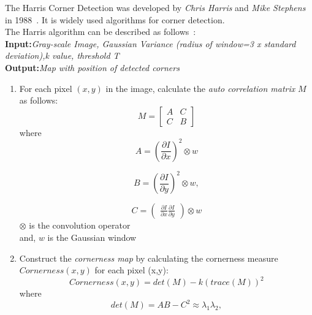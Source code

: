 The Harris Corner Detection was developed by \emph{Chris Harris} and \emph{Mike Stephens} in 1988~\cite{Parks:11}. It is widely used algorithms for corner detection.\\

\noindent The Harris algorithm can be described as follows~\cite{Parks:11}:\\

\noindent \textbf{Input:}\textit{Gray-scale Image, Gaussian Variance (radius of window=3 x standard deviation),k value, threshold T}\\
\textbf{Output:}\textit{Map with position of detected corners}\\
\begin{enumerate}
	\item For each pixel $(x,y)$ in the image, calculate the \emph{auto correlation matrix} $M$ as follows:\\ 
	\begin{equation}
		M=\left[ \begin{array}{cc}
			A & C\\
			C & B 
		\end{array}
		\right] 
	\label{eq:hessian-matrix}
	\end{equation}			
	where 
	\begin{equation}
					A=\left(\frac{\partial I}{\partial x}\right)^2 \otimes w 
	\label{eq:A}
	\end{equation}
	
	\begin{equation}
	        B=\left( \frac{\partial I}{\partial y} \right)^2 \otimes w, 
	\label{eq:B}
	\end{equation}
	
	\begin{equation}
				 C=\left( \begin{array}{c}\frac{\partial I}{\partial x} \frac{\partial I}{\partial y}\end{array}\right) \otimes w
	\label{eq:C}
	\end{equation} 
				$\otimes$ is the convolution operator\\
				and, $w$ is the Gaussian window	
						
\item Construct the \emph{cornerness map} by calculating the cornerness measure $Cornerness(x,y)$ for each pixel (x,y):\\
\begin{equation}
Cornerness(x,y)=det(M)-k(trace(M))^2
\label{eq:cornerness-map}
\end{equation} 
where 
\begin{equation}
det(M)=AB-C^2 \approx \lambda_1 \lambda_2,
\label{eq:deter-M}
\end{equation}


\end{enumerate}
